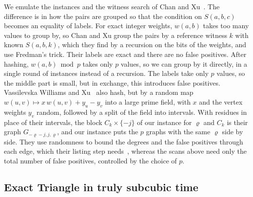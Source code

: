 \begin{remark}
We emulate the instances and the witness search of Chan and Xu~\cite[Section~3]{CX24}. The difference is in how the pairs are grouped so that the condition on $S(a,b,c)$ becomes an equality of labels. For exact integer weights, $w(a,b)$ takes too many values to group by, so Chan and Xu group the pairs by a reference witness $k$ with known $S(a,b,k)$, which they find by a recursion on the bits of the weights, and use Fredman's trick. Their labels are exact and there are no false positives. After hashing, $w(a,b)\bmod p$ takes only $p$ values, so we can group by it directly, in a single round of instances instead of a recursion. The labels take only $p$ values, so the middle part is small, but in exchange, this introduces false positives. Vassilevska Williams and Xu~\cite[Theorem~3.4]{VX20a} also hash, but by a random map $w(u,v)\mapsto x\,w(u,v)+y_u-y_v$ into a large prime field, with $x$ and the vertex weights $y_v$ random, followed by a split of the field into intervals. With residues in place of their intervals, the block $C_k\times\{-j\}$ of our instance for $\varrho$ and $C_k$ is their graph $G_{-\varrho-j,j,\varrho}$, and our instance puts the $p$ graphs with the same $\varrho$ side by side. They use randomness to bound the degrees and the false positives through each edge, which their listing step needs~\cite[Claims~3.5 and~3.6, Proposition~3.8]{VX20a}, whereas the scans above need only the total number of false positives, controlled by the choice of $p$.
\end{remark}

\subsection{Exact Triangle in truly subcubic time}\label{sec:zwt}

